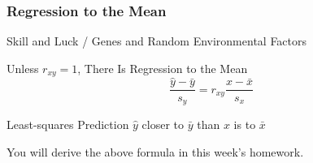 \documentclass[handout]{beamer}
\begin{document}
%
%
%
%
%
%
%
%
%
%
%
%
%
%
%
%

\begin{frame}
\frametitle{Regression to the Mean}

\begin{block}{Skill and Luck / Genes and Random Environmental Factors}\end{block}


\begin{block}{Unless $r_{xy}=1$, There Is Regression to the Mean}
$$\frac{\hat{y} - \bar{y}}{{s_y}} = r_{xy} \frac{x - \bar{x}}{s_x}$$
\end{block}

\begin{alertblock}{Least-squares Prediction $\hat{y}$ closer to $\bar{y}$ than $x$ is to $\bar{x}$}
\end{alertblock}
You will derive the above formula in this week's homework.
\end{frame}
%
%
%
\end{document}
